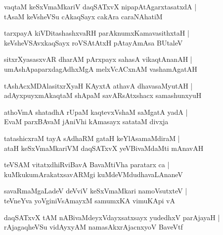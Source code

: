 \documentclass[twoside,12pt,openright]{book}
\newcounter{shloka}[chapter]
\begin{document}
\begin{shloka}%
vaqtaM keSxVmaMkariV daqSATxvX nipapAtAgarxtasatxdA |\\
tAsaM keVsheVSu cAkaqSayx cakAra caraNAhatiM 
\end{shloka}

\begin{shloka}%
tarxpayA kiVDitashashxvaRH parAknumxKamavasithxtaH |\\
keVsheVSAvxkaqSayx roVSAtAtxH pAtayAmAsa BUtaleV
\end{shloka}

\begin{shloka}%
sitxrXyasasxvAR dharAM pArxpayx sahasA vikaqtAnanAH |\\
umAshApaparxdagAdhxMgA melxVcACxnAM vashamAgatAH 
\end{shloka}

\begin{shloka}%
tAshAcxMDAlasitxrXyaH KAyxtA athavA dhavasaMyutAH |\\
adAyxpuyxmAkaqtaM shApaM savARsAtxshacx samashunxyuH 
\end{shloka}

\begin{shloka}%
athoVmA shatadhA rUpaM kaqtevxVshaM saMgatA yadA |\\
EvaM parxBAvaM jAniVhi kAmasayx satataM divxja 
\end{shloka}

\begin{shloka}%
tatashicxraM tayA sAdhaRM gataH keYlAsamaMdiraM |\\
ataH keSxVmaMkariVM daqSATxvX yeVBivaMdaMti mAnavAH 
\end{shloka}

\begin{shloka}%
teVSAM vitatxdhiRviBavA BavaMtiVha paratarx ca |\\
kuMkukumArakatxsavARMgi kuMdeVMdudhavaLAnaneV 
\end{shloka}

\begin{shloka}%
savaRmaMgaLadeV deVviV keSxVmaMkari namoVsutxteV |\\
teVneYva yoVginiVsAmayxM samumxKA vimuKApi vA
\end{shloka}

\begin{shloka}%
daqSATxvX tAM nABivaMdeyxVdayxsatxsayx yudedhxV parAjayaH |\\
rAjagaqheVSu vidAyxyAM namasAkxrAjacnxyoV BaveVtf
\end{shloka}
\end{document}

